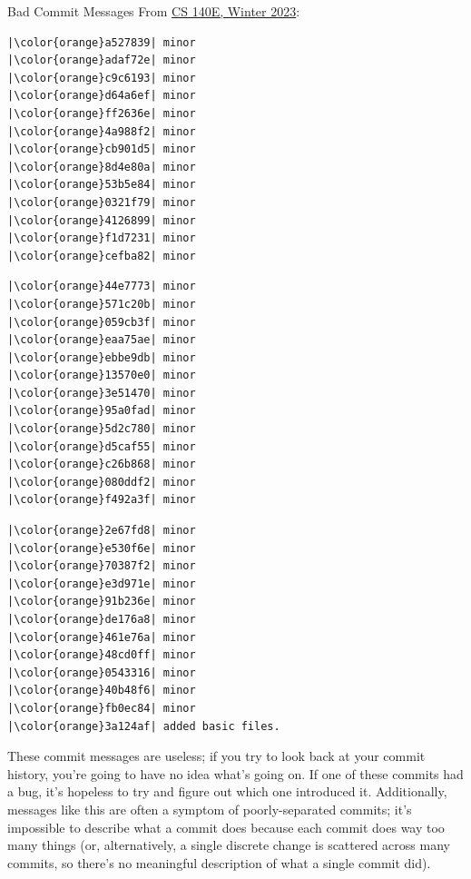 \begin{frame}[fragile]{Bad Commit Messages}
  \vspace{-0.5em}
   {
    From \href{https://github.com/dddrrreee/cs140e-23win}{CS 140E, Winter 2023}:
  }
  \begin{multicols}{3}[]
    \begin{verbatim}
|\color{orange}a527839| minor
|\color{orange}adaf72e| minor
|\color{orange}c9c6193| minor
|\color{orange}d64a6ef| minor
|\color{orange}ff2636e| minor
|\color{orange}4a988f2| minor
|\color{orange}cb901d5| minor
|\color{orange}8d4e80a| minor
|\color{orange}53b5e84| minor
|\color{orange}0321f79| minor
|\color{orange}4126899| minor
|\color{orange}f1d7231| minor
|\color{orange}cefba82| minor
    \end{verbatim}
    \vfill
    \pause
    \begin{verbatim}
|\color{orange}44e7773| minor
|\color{orange}571c20b| minor
|\color{orange}059cb3f| minor
|\color{orange}eaa75ae| minor
|\color{orange}ebbe9db| minor
|\color{orange}13570e0| minor
|\color{orange}3e51470| minor
|\color{orange}95a0fad| minor
|\color{orange}5d2c780| minor
|\color{orange}d5caf55| minor
|\color{orange}c26b868| minor
|\color{orange}080ddf2| minor
|\color{orange}f492a3f| minor
    \end{verbatim}
    \vfill
    \pause
    \begin{verbatim}
|\color{orange}2e67fd8| minor
|\color{orange}e530f6e| minor
|\color{orange}70387f2| minor
|\color{orange}e3d971e| minor
|\color{orange}91b236e| minor
|\color{orange}de176a8| minor
|\color{orange}461e76a| minor
|\color{orange}48cd0ff| minor
|\color{orange}0543316| minor
|\color{orange}40b48f6| minor
|\color{orange}fb0ec84| minor
|\color{orange}3a124af| added basic files.
    \end{verbatim}
  \end{multicols}
\end{frame}

These commit messages are useless; if you try to look back at your commit
history, you're going to have no idea what's going on.  If one of these commits
had a bug, it's hopeless to try and figure out which one introduced it.
Additionally, messages like this are often a symptom of poorly-separated
commits; it's impossible to describe what a commit does because each commit
does way too many things (or, alternatively, a single discrete change is
scattered across many commits, so there's no meaningful description of what a
single commit did).

